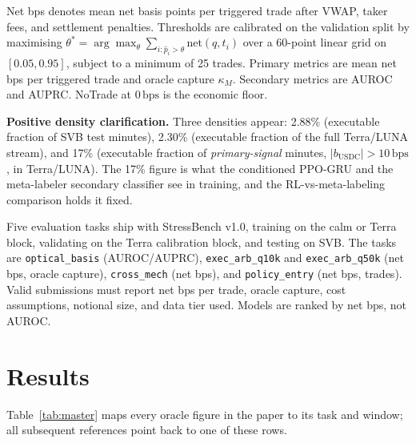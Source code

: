 \documentclass[sigconf,anonymous,natbib=false]{acmart}
\newcommand{\bps}{\,\text{bps}}
\newcommand{\task}[1]{\texttt{\small #1}}
\begin{document}
Net bps denotes mean net basis points per triggered trade after VWAP,
taker fees, and settlement penalties.
Thresholds are calibrated on the validation split by maximising
$\theta^* = \arg\max_\theta \sum_{i:\hat{p}_i>\theta} \text{net}(q,t_i)$
over a 60-point linear grid on $[0.05, 0.95]$, subject to a minimum of 25 trades.
Primary metrics are mean net bps per triggered trade and oracle
capture $\kappa_M$.
Secondary metrics are AUROC and AUPRC.
NoTrade at $0\bps$ is the economic floor.

\textbf{Positive density clarification.}
Three densities appear: 2.88\% (executable fraction of SVB test minutes), 2.30\%
(executable fraction of the full Terra/LUNA stream), and 17\% (executable fraction
of \emph{primary-signal} minutes, $|b_{\text{USDC}}|>10\bps$, in Terra/LUNA). The
17\% figure is what the conditioned PPO-GRU and the meta-labeler secondary classifier
see in training, and the RL-vs-meta-labeling comparison holds it fixed.

Five evaluation tasks ship with StressBench v1.0, training on the calm or
Terra block, validating on the Terra calibration block, and testing on SVB.
The tasks are \task{optical\_basis} (AUROC/AUPRC),
\task{exec\_arb\_q10k} and \task{exec\_arb\_q50k} (net bps, oracle capture),
\task{cross\_mech} (net bps),
and \task{policy\_entry} (net bps, trades).
Valid submissions must report net bps per trade, oracle capture,
cost assumptions, notional size, and data tier used.
Models are ranked by net bps, not AUROC.


\section{Results}
\label{sec:results}

Table~\ref{tab:master} maps every oracle figure in the paper to its task and window;
all subsequent references point back to one of these rows.
\end{document}
